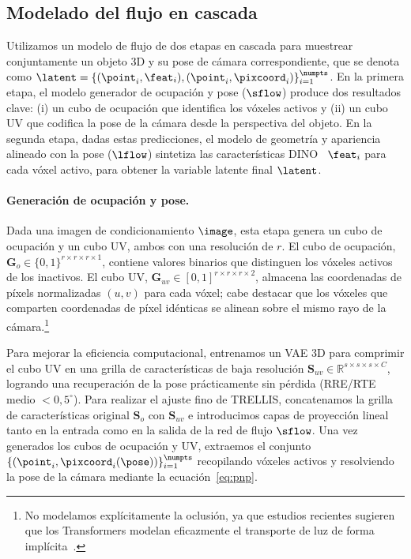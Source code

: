 \documentclass[../../book-main_es.tex]{subfiles}
\begin{document}
\subsection{Modelado del flujo en cascada}
\label{sec:flow_model}

Utilizamos un modelo de flujo de dos etapas en cascada para muestrear conjuntamente un objeto 
3D y su pose de cámara correspondiente, que se denota como 
$\latent = \{ (\point_i, \feat_i), (\point_i,\pixcoord_i) \}_{i=1}^{\numpts}$. En la primera 
etapa, el modelo generador de ocupación y pose ($\sflow$) produce dos resultados clave: 
(i) un cubo de ocupación que identifica los vóxeles activos y (ii) un cubo UV que codifica 
la pose de la cámara desde la perspectiva del objeto. En la segunda etapa, dadas estas 
predicciones, el modelo de geometría y apariencia alineado con la pose ($\lflow$) sintetiza 
las características DINO~\citep{oquab2023dinov2} $\feat_i$ para cada vóxel activo, para
obtener la variable latente final $\latent$.

\paragraph{Generación de ocupación y pose.}
Dada una imagen de condicionamiento \(\image\), esta etapa genera un cubo de ocupación y un 
cubo UV, ambos con una resolución de $r$. El cubo de ocupación, 
\(\boldsymbol{G}_o \in \{0,1\}^{r \times r \times r \times 1}\), contiene valores binarios 
que distinguen los vóxeles activos de los inactivos. El cubo UV, 
\(\boldsymbol{G}_{uv} \in [0,1]^{r \times r \times r \times 2}\), almacena las coordenadas 
de píxels normalizadas $(u,v)$ para cada vóxel; cabe destacar que los vóxeles que comparten 
coordenadas de píxel idénticas se alinean sobre el mismo rayo de la cámara.\footnote{No 
    modelamos explícitamente la oclusión, ya que estudios recientes sugieren que los 
    Transformers modelan eficazmente el transporte de luz de forma 
implícita~\citep{jin2024lvsm, zeng2025renderformer}.}

Para mejorar la eficiencia computacional, entrenamos un VAE 3D para comprimir el cubo UV en 
una grilla de características de baja resolución 
\(\boldsymbol{S}_{uv} \in \mathbb{R}^{s\times s\times s \times C}\), logrando una recuperación 
de la pose prácticamente sin pérdida (RRE/RTE medio $< 0,5^\circ$). Para realizar el ajuste fino de TRELLIS, 
concatenamos la grilla de características original 
\(\boldsymbol{S}_o\) con \(\boldsymbol{S}_{uv}\) e introducimos capas de proyección lineal 
tanto en la entrada como en la salida de la red de flujo $\sflow$. Una vez generados los cubos 
de ocupación y UV, extraemos el conjunto 
$\{ (\point_i, \pixcoord_i(\pose)) \}_{i=1}^{\numpts}$ recopilando vóxeles activos y resolviendo 
la pose de la cámara mediante la ecuación~\ref{eq:pnp}.
\end{document}
